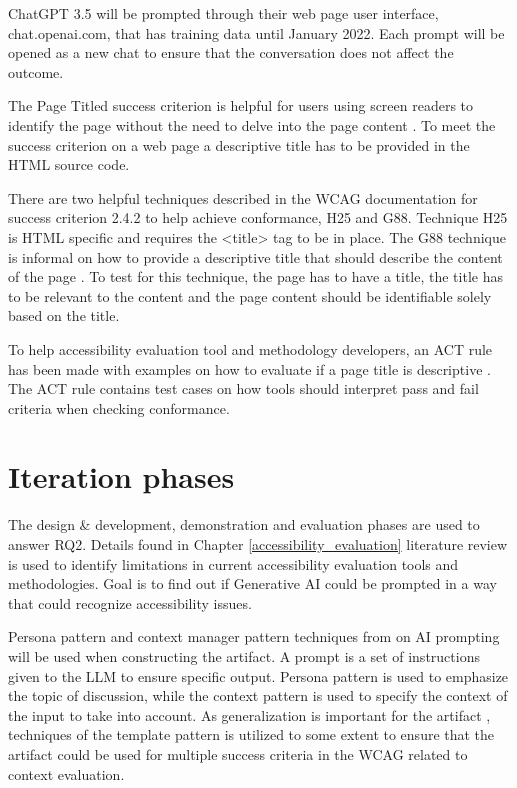 ChatGPT 3.5 will be prompted through their web page user interface, chat.openai.com, that has training data until January 2022. Each prompt will be opened as a new chat to ensure that the conversation does not affect the outcome. 

The Page Titled success criterion is helpful for users using screen readers to identify the page without the need to delve into the page content \citep{wcag_page_titled}. To meet the success criterion on a web page a descriptive title has to be provided in the HTML source code. 

There are two helpful techniques described in the WCAG documentation for success criterion 2.4.2 to help achieve conformance, H25 and G88. Technique H25 is HTML specific and requires the <title> tag to be in place. The G88 technique is informal on how to provide a descriptive title that should describe the content of the page \citep{g88}. To test for this technique, the page has to have a title, the title has to be relevant to the content and the page content should be identifiable solely based on the title.

To help accessibility evaluation tool and methodology developers, an ACT rule has been made with examples on how to evaluate if a page title is descriptive \citep{act_rule_g88}. The ACT rule contains test cases on how tools should interpret pass and fail criteria when checking conformance. 

\section{Iteration phases}

The design \& development, demonstration and evaluation phases are used to answer RQ2. Details found in Chapter \ref{accessibility_evaluation} literature review is used to identify limitations in current accessibility evaluation tools and methodologies. Goal is to find out if Generative AI could be prompted in a way that could recognize accessibility issues. 

Persona pattern and context manager pattern techniques from \textcite{white2023prompt} on AI prompting will be used when constructing the artifact. A prompt is a set of instructions given to the LLM to ensure specific output. Persona pattern is used to emphasize the topic of discussion, while the context pattern is used to specify the context of the input to take into account. As generalization is important for the artifact \citep{design_science_eval}, techniques of the template pattern is utilized to some extent to ensure that the artifact could be used for multiple success criteria in the WCAG related to context evaluation.

